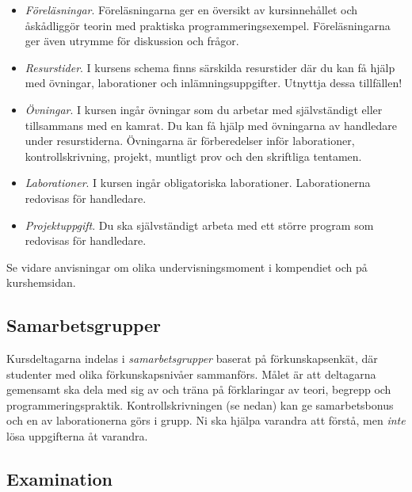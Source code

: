 \documentclass[a4paper,12pt,oneside]{memoir}
\begin{document}
\begin{itemize}
\item
  \emph{Föreläsningar}. Föreläsningarna ger en översikt av
  kursinnehållet och åskådliggör teorin med praktiska
  programmeringsexempel. Föreläsningarna ger även utrymme för diskussion
  och frågor.
\item
  \emph{Resurstider}. I kursens schema finns särskilda resurstider
  där du kan få hjälp med övningar, laborationer och
  inlämningsuppgifter. Utnyttja dessa tillfällen!
\item
  \emph{Övningar}. I kursen ingår övningar som du arbetar med
  självständigt eller tillsammans med en kamrat.
  Du kan få hjälp med övningarna av handledare under resurstiderna.
  Övningarna är förberedelser inför laborationer, kontrollskrivning, projekt, muntligt prov och den skriftliga tentamen.
\item
  \emph{Laborationer}. I kursen ingår obligatoriska laborationer.
  Laborationerna redovisas för handledare.
\item
  \emph{Projektuppgift}. Du ska självständigt arbeta med ett större
  program som redovisas för handledare. %
\end{itemize}
Se vidare anvisningar om olika undervisningsmoment i kompendiet och på kurshemsidan.

\subsection{Samarbetsgrupper}\label{samarbetsgrupper}

Kursdeltagarna indelas i \emph{samarbetsgrupper} baserat
på förkunskapsenkät, där studenter med olika förkunskapsnivåer
sammanförs. Målet är att deltagarna gemensamt ska
dela med sig av och träna på förklaringar av teori, begrepp och
programmeringspraktik. Kontrollskrivningen (se
nedan) kan ge samarbetsbonus  och en av laborationerna görs i grupp. Ni ska hjälpa varandra att
förstå, men \emph{inte} lösa uppgifterna åt varandra.

\subsection{Examination}\label{examination}
\end{document}

